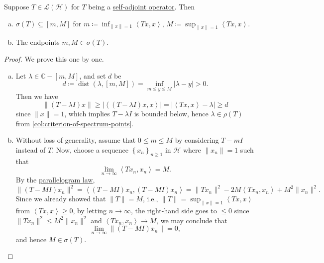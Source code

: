\begin{theorem}\label{thm:spectrum-interval}
	Suppose \(T \in \mathcal{L} (\mathcal{H} )\) for \(T\) being a \hyperref[def:self-adjoint-op]{self-adjoint operator}. Then
	\begin{enumerate}[(a)]
		\item \(\sigma (T) \subseteq [m, M]\) for \(m\coloneqq \inf _{\lVert x \rVert = 1}\left\langle Tx, x \right\rangle \), \(M\coloneqq \sup _{\lVert x \rVert = 1} \left\langle Tx, x \right\rangle \).
		\item The endpoints \(m, M\in \sigma (T)\).
	\end{enumerate}
\end{theorem}
\begin{proof}
	We prove this one by one.
	\begin{enumerate}[(a)]
		\item Let \(\lambda \in \mathbb{C} -[m, M]\), and set \(d\) be
		      \[
			      d\coloneqq \mathop{\mathrm{dist}}(\lambda , [m, M])
			      = \inf _{m \leq y\leq M} \vert \lambda -y \vert > 0.
		      \]
		      Then we have
		      \[
			      \lVert (T-\lambda I)x \rVert
			      \geq \vert \left\langle (T-\lambda I)x, x \right\rangle  \vert
			      = \vert \left\langle Tx, x \right\rangle - \lambda  \vert
			      \geq d
		      \]
		      since \(\lVert x \rVert = 1\), which implies \(T - \lambda I\) is bounded below, hence \(\lambda \in \rho (T)\) from \autoref{col:criterion-of-spectrum-points}.
		\item Without loss of generality, assume that \(0 \leq m \leq M\) by considering \(T - mI\) instead of \(T\). Now, choose a sequence \(\left\{ x_n \right\} _{n\geq 1}\) in \(\mathcal{H} \) where \(\lVert x_n \rVert = 1\) such that
		      \[
			      \lim_{n \to \infty} \left\langle Tx_n, x_n \right\rangle = M.
		      \]
		      By the \hyperref[lma:parallelogram-law]{parallelogram law},
		      \[
			      \lVert (T-MI)x_n \rVert ^{2}
			      = \left\langle (T-MI)x_n, (T-MI)x_n \right\rangle
			      = \lVert Tx_n \rVert ^2 - 2M\left\langle Tx_n, x_n \right\rangle + M^{2} \lVert x_n \rVert ^{2}.
		      \]
		      Since we already showed that \(\lVert T \rVert = M\), i.e., \(\lVert T \rVert = \sup _{\lVert x \rVert = 1}\left\langle Tx, x \right\rangle \) from \(\left\langle Tx, x \right\rangle \geq 0\), by letting \(n \to \infty \), the right-hand side goes to \(\leq 0\) since \(\lVert Tx_n \rVert ^{2} \leq M^{2} \lVert x_n \rVert ^{2} \) and \(\left\langle Tx_n, x_n \right\rangle \to M\), we may conclude that
		      \[
			      \lim_{n \to \infty} \lVert (T-MI)x_n \rVert = 0,
		      \]
		      and hence \(M\in \sigma (T)\).
	\end{enumerate}
\end{proof}

